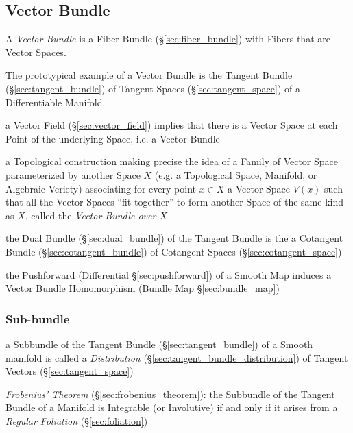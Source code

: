 \subsection{Vector Bundle}\label{sec:vector_bundle}


A \emph{Vector Bundle} is a Fiber Bundle (\S\ref{sec:fiber_bundle}) with Fibers
that are Vector Spaces.

The prototypical example of a Vector Bundle is the Tangent Bundle
(\S\ref{sec:tangent_bundle}) of Tangent Spaces (\S\ref{sec:tangent_space}) of a
Differentiable Manifold.

a Vector Field (\S\ref{sec:vector_field}) implies that there is a Vector Space
at each Point of the underlying Space, i.e. a Vector Bundle

a Topological construction making precise the idea of a Family of Vector Space
parameterized by another Space $X$ (e.g. a Topological Space, Manifold, or
Algebraic Veriety) associating for every point $x \in X$ a Vector Space $V(x)$
such that all the Vector Spaces ``fit together'' to form another Space of the
same kind as $X$, called the \emph{Vector Bundle over $X$}

the Dual Bundle (\S\ref{sec:dual_bundle}) of the Tangent Bundle is the
a Cotangent Bundle (\S\ref{sec:cotangent_bundle}) of
Cotangent Spaces (\S\ref{sec:cotangent_space})

the Pushforward (Differential \S\ref{sec:pushforward}) of a Smooth Map induces a
Vector Bundle Homomorphism (Bundle Map \S\ref{sec:bundle_map})



\subsubsection{Sub-bundle}\label{sec:subbundle}

\fist a Subbundle of the Tangent Bundle (\S\ref{sec:tangent_bundle}) of a
Smooth manifold is called a \emph{Distribution}
(\S\ref{sec:tangent_bundle_distribution}) of Tangent Vectors
(\S\ref{sec:tangent_space})


\emph{Frobenius' Theorem} (\S\ref{sec:frobenius_theorem}): the Subbundle of the
Tangent Bundle of a Manifold is Integrable (or Involutive) if and only if it
arises from a \emph{Regular Foliation} (\S\ref{sec:foliation})



